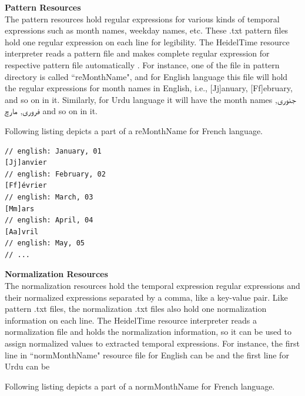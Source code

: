 \textbf{Pattern Resources}\\
The pattern resources hold regular expressions for various kinds of temporal expressions such as month names, weekday names, etc. These .txt pattern files hold one regular expression on each line for legibility. The HeidelTime resource interpreter reads a pattern file and makes complete regular expression for respective pattern file automatically \cite{DBLP:phd/de/Strotgen15}. For instance, one of the file in pattern directory is called ``reMonthName", and for English language this file will hold the regular expressions for month names in English, i.e., [Jj]anuary, [Ff]ebruary, and so on in it. Similarly, for Urdu language it will have the month names \texturdu{جنوری}, \texturdu{فروری}, \texturdu{مارچ} and so on in it. 

Following listing depicts a part of a reMonthName for French language. \\


\begin{minipage}{\linewidth}
\begin{lstlisting}
// english: January, 01
[Jj]anvier
// english: February, 02
[Ff]évrier
// english: March, 03
[Mm]ars
// english: April, 04
[Aa]vril
// english: May, 05
// ...
\end{lstlisting}
\end{minipage}

\textbf{Normalization Resources}\\
The normalization resources hold the temporal expression regular expressions and their normalized expressions separated by a comma, like a key-value pair. Like pattern .txt files, the normalization .txt files also hold one normalization information on each line. The HeidelTime resource interpreter reads a normalization file and holds the normalization information, so it can be used to assign normalized values to extracted temporal expressions. For instance, the first line in ``normMonthName" resource file for English can be  and the first line for Urdu can be 

Following listing depicts a part of a normMonthName for French language. \\


